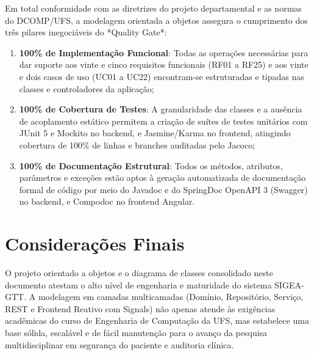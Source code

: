 Em total conformidade com as diretrizes do projeto departamental e as normas do DCOMP/UFS, a modelagem orientada a objetos assegura o cumprimento dos três pilares inegociáveis do *Quality Gate*:
\begin{enumerate}
    \item \textbf{100\% de Implementação Funcional}: Todas as operações necessárias para dar suporte aos vinte e cinco requisitos funcionais (RF01 a RF25) e aos vinte e dois casos de uso (UC01 a UC22) encontram-se estruturadas e tipadas nas classes e controladores da aplicação;
    \item \textbf{100\% de Cobertura de Testes}: A granularidade das classes e a ausência de acoplamento estático permitem a criação de suítes de testes unitários com JUnit 5 e Mockito no backend, e Jasmine/Karma no frontend, atingindo cobertura de 100\% de linhas e branches auditadas pelo Jacoco;
    \item \textbf{100\% de Documentação Estrutural}: Todos os métodos, atributos, parâmetros e exceções estão aptos à geração automatizada de documentação formal de código por meio do Javadoc e do SpringDoc OpenAPI 3 (Swagger) no backend, e Compodoc no frontend Angular.
\end{enumerate}

\section{Considerações Finais}
\label{sec_consideracoes_finais}

O projeto orientado a objetos e o diagrama de classes consolidado neste documento atestam o alto nível de engenharia e maturidade do sistema SIGEA-GTT. A modelagem em camadas multicamadas (Domínio, Repositório, Serviço, REST e Frontend Reativo com Signals) não apenas atende às exigências acadêmicas do curso de Engenharia de Computação da UFS, mas estabelece uma base sólida, escalável e de fácil manutenção para o avanço da pesquisa multidisciplinar em segurança do paciente e auditoria clínica.
